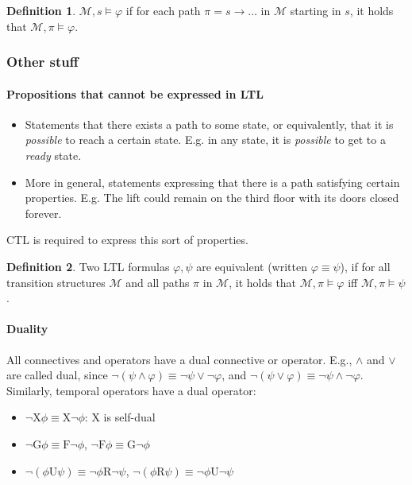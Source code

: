 \documentclass[10pt,a4paper]{article}
\theoremstyle{definition}
\newtheorem{definition}{Definition}[section]
\begin{document}
\begin{definition}\label{def:defLTLs}
$\mathcal{M}, s \models \varphi$ if for each path $\pi = s \rightarrow \dots $ in $ \mathcal{M} $ starting in $s$, it holds that $ \mathcal{M}, \pi \models \varphi$.
\end{definition}

\subsubsection{Other stuff}

\paragraph{Propositions that cannot be expressed in LTL}

\begin{itemize}
	\item Statements that there exists a path to some state, or equivalently, that it is \textit{possible} to reach a certain state. E.g. in any state, it is \textit{possible} to get to a \textit{ready} state.
	\item More in general, statements expressing that there is a path satisfying certain properties. E.g. The lift could remain on the third floor with its doors closed forever.
\end{itemize}
CTL is required to express this sort of properties.


\begin{definition}
Two LTL formulas $\varphi, \psi$ are equivalent (written $\varphi \equiv \psi$), if for all transition structures $\mathcal{M}$ and all paths $\pi$ in $\mathcal{M}$, it holds that $\mathcal{M}, \pi \models \varphi$ iff $ \mathcal{M}, \pi \models \psi$.
\end{definition}

\paragraph{Duality} All connectives and operators have a dual connective or operator. E.g., $\land$ and $\lor$ are called dual, since $\lnot (\psi \land \varphi) \equiv \lnot \psi \lor \lnot \varphi$, and $\lnot ( \psi \lor \varphi) \equiv \lnot \psi \land \lnot \varphi $. Similarly, temporal operators have a dual operator:

\begin{itemize}
	\item $\lnot \text{X} \phi \equiv \text{X} \lnot \phi$: X is self-dual
	\item $\lnot \text{G} \phi \equiv \text{F} \lnot \phi$, $\lnot \text{F} \phi \equiv \text{G} \lnot \phi$
	\item $\lnot (\phi \text{U} \psi) \equiv \lnot \phi \text{R} \lnot \psi$, $\lnot (\phi \text{R} \psi) \equiv \lnot \phi \text{U} \lnot \psi$
\end{itemize}
\end{document}
